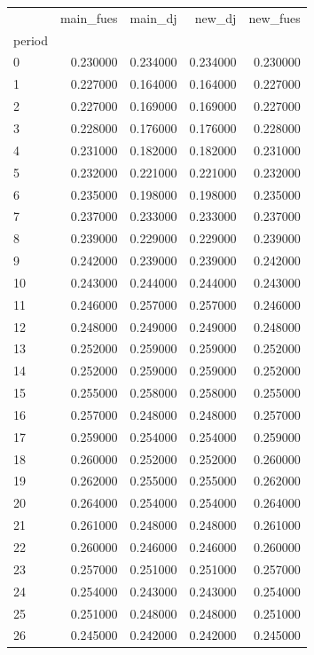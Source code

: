 \begin{tabular}{lrrrr}
\toprule
 & main_fues & main_dj & new_dj & new_fues \\
period &  &  &  &  \\
\midrule
0 & 0.230000 & 0.234000 & 0.234000 & 0.230000 \\
1 & 0.227000 & 0.164000 & 0.164000 & 0.227000 \\
2 & 0.227000 & 0.169000 & 0.169000 & 0.227000 \\
3 & 0.228000 & 0.176000 & 0.176000 & 0.228000 \\
4 & 0.231000 & 0.182000 & 0.182000 & 0.231000 \\
5 & 0.232000 & 0.221000 & 0.221000 & 0.232000 \\
6 & 0.235000 & 0.198000 & 0.198000 & 0.235000 \\
7 & 0.237000 & 0.233000 & 0.233000 & 0.237000 \\
8 & 0.239000 & 0.229000 & 0.229000 & 0.239000 \\
9 & 0.242000 & 0.239000 & 0.239000 & 0.242000 \\
10 & 0.243000 & 0.244000 & 0.244000 & 0.243000 \\
11 & 0.246000 & 0.257000 & 0.257000 & 0.246000 \\
12 & 0.248000 & 0.249000 & 0.249000 & 0.248000 \\
13 & 0.252000 & 0.259000 & 0.259000 & 0.252000 \\
14 & 0.252000 & 0.259000 & 0.259000 & 0.252000 \\
15 & 0.255000 & 0.258000 & 0.258000 & 0.255000 \\
16 & 0.257000 & 0.248000 & 0.248000 & 0.257000 \\
17 & 0.259000 & 0.254000 & 0.254000 & 0.259000 \\
18 & 0.260000 & 0.252000 & 0.252000 & 0.260000 \\
19 & 0.262000 & 0.255000 & 0.255000 & 0.262000 \\
20 & 0.264000 & 0.254000 & 0.254000 & 0.264000 \\
21 & 0.261000 & 0.248000 & 0.248000 & 0.261000 \\
22 & 0.260000 & 0.246000 & 0.246000 & 0.260000 \\
23 & 0.257000 & 0.251000 & 0.251000 & 0.257000 \\
24 & 0.254000 & 0.243000 & 0.243000 & 0.254000 \\
25 & 0.251000 & 0.248000 & 0.248000 & 0.251000 \\
26 & 0.245000 & 0.242000 & 0.242000 & 0.245000 \\

\end{tabular}
